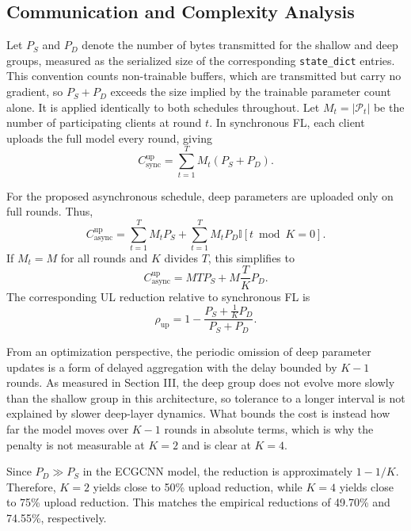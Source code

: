 \documentclass[10pt,conference]{IEEEtran}
\begin{document}
\subsection{Communication and Complexity Analysis}

Let $P_S$ and $P_D$ denote the number of bytes transmitted for the shallow and deep groups, measured as the serialized size of the corresponding \texttt{state\_dict} entries. This convention counts non-trainable buffers, which are transmitted but carry no gradient, so $P_S+P_D$ exceeds the size implied by the trainable parameter count alone. It is applied identically to both schedules throughout. Let $M_t=|\mathcal{P}_t|$ be the number of participating clients at round $t$. In synchronous FL, each client uploads the full model every round, giving
\begin{equation}
C_{\text{sync}}^{\text{up}}
=
\sum_{t=1}^{T} M_t(P_S+P_D).
\end{equation}

For the proposed asynchronous schedule, deep parameters are uploaded only on full rounds. Thus,
\begin{equation}
C_{\text{async}}^{\text{up}}
=
\sum_{t=1}^{T}M_tP_S
+
\sum_{t=1}^{T}M_tP_D\mathbb{I}[t\bmod K=0].
\end{equation}
If $M_t=M$ for all rounds and $K$ divides $T$, this simplifies to
\begin{equation}
C_{\text{async}}^{\text{up}}
=
MT P_S
+
M\frac{T}{K}P_D.
\end{equation}
The corresponding UL reduction relative to synchronous FL is
\begin{equation}
\rho_{\text{up}}
=
1-
\frac{P_S+\frac{1}{K}P_D}{P_S+P_D}.
\end{equation}

\noindent
From an optimization perspective, the periodic omission of deep parameter updates is a form of delayed aggregation with the delay bounded by $K-1$ rounds. As measured in Section III, the deep group does not evolve more slowly than the shallow group in this architecture, so tolerance to a longer interval is not explained by slower deep-layer dynamics. What bounds the cost is instead how far the model moves over $K-1$ rounds in absolute terms, which is why the penalty is not measurable at $K=2$ and is clear at $K=4$.

Since $P_D\gg P_S$ in the ECGCNN model, the reduction is approximately $1-1/K$. Therefore, $K=2$ yields close to 50\% upload reduction, while $K=4$ yields close to 75\% upload reduction. This matches the empirical reductions of 49.70\% and 74.55\%, respectively.
\end{document}
